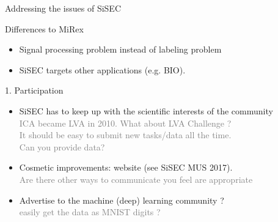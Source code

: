 \documentclass{beamer}
\begin{document}



\begin{frame}{Addressing the issues of SiSEC}

Differences to MiRex

\begin{itemize}
	\item Signal processing problem instead of labeling problem
	\item SiSEC targets other applications (e.g. BIO).
\end{itemize}
\end{frame}

\begin{frame}{1. Participation}

\begin{itemize}
\item
SiSEC has to keep up with the scientific interests of the community\\
\textcolor{gray}{ICA became LVA in 2010. What about LVA Challenge ?\\
It should be easy to submit new tasks/data all the time.\\Can you provide data?} 
\item
Cosmetic improvements: website (see SiSEC MUS 2017).\\
\textcolor{gray}{Are there other ways to communicate you feel are appropriate}
\item Advertise to the machine (deep) learning community ?\\
\textcolor{gray}{easily get the data as MNIST digits ? }

\end{itemize}

\end{frame}
\end{document}

